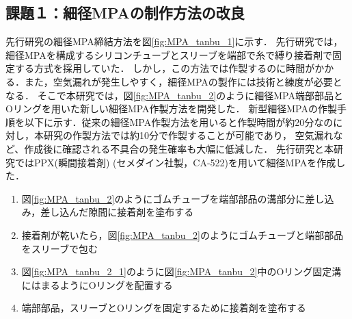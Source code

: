 \subsection{課題１：細径MPAの制作方法の改良}
先行研究\cite{hasegawa}の細径MPA締結方法を図\ref{fig:MPA_tanbu_1}に示す．
先行研究\cite{hasegawa}では，細径MPAを構成するシリコンチューブとスリーブを端部で糸で縛り接着剤で固定する方式を採用していた．
しかし，この方法では作製するのに時間がかかる．また，空気漏れが発生しやすく，細径MPAの製作には技術と練度が必要となる．
そこで本研究では，図\ref{fig:MPA_tanbu_2}のように細径MPA端部部品とOリングを用いた新しい細径MPA作製方法を開発した．
新型細径MPAの作製手順を以下に示す．従来の細径MPA作製方法を用いると作製時間が約20分なのに対し，本研究の作製方法では約10分で作製することが可能であり，
空気漏れなど、作成後に確認される不具合の発生確率も大幅に低減した．
先行研究と本研究ではPPX(瞬間接着剤) (セメダイン社製，CA-522)を用いて細径MPAを作成した．
\begin{enumerate}
  \item 図\ref{fig:MPA_tanbu_2}のようにゴムチューブを端部部品の溝部分に差し込み，差し込んだ隙間に接着剤を塗布する
  \item 接着剤が乾いたら，図\ref{fig:MPA_tanbu_2}のようにゴムチューブと端部部品をスリーブで包む
  \item 図\ref{fig:MPA_tanbu_2_1}のように図\ref{fig:MPA_tanbu_2}中のOリング固定溝にはまるようにOリングを配置する
  \item 端部部品，スリーブとOリングを固定するために接着剤を塗布する
\end{enumerate}
